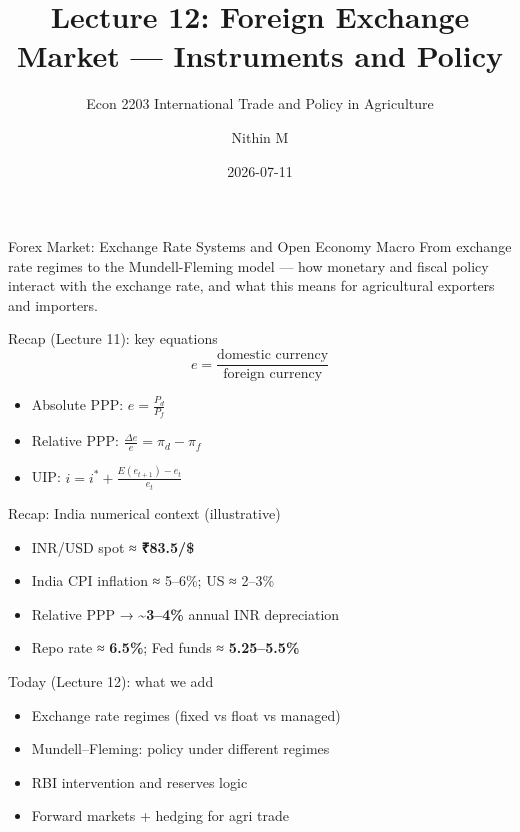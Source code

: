 \documentclass[
  ignorenonframetext,
  aspectratio=169,
]{beamer}
\title[L12 \textbar{} Forex Market]{Lecture 12: Foreign Exchange Market
--- Instruments and Policy}
\subtitle{Econ 2203 \textbar{} International Trade and Policy in
Agriculture}
\author{Nithin M}
\date{2026-07-11}
\institute{Department of Development Economics}
\makeatletter
\providecommand{\tightlist}{%
  \setlength{\itemsep}{0pt}\setlength{\parskip}{0pt}}
\let\quarto@originallabel\label
\DeclareRobustCommand*{\label}[1]{\quarto@originallabel{#1}}
\makeatother
\begin{document}
\frame{\titlepage}


\begin{frame}{Forex Market: Exchange Rate Systems and Open Economy
Macro}
\label{forex-market-exchange-rate-systems-and-open-economy-macro}
From exchange rate regimes to the Mundell-Fleming model --- how monetary
and fiscal policy interact with the exchange rate, and what this means
for agricultural exporters and importers.
\end{frame}

\begin{frame}{Recap (Lecture 11): key equations}
\label{recap-lecture-11-key-equations}
\[e = \frac{\text{domestic currency}}{\text{foreign currency}}\]

\begin{itemize}
\tightlist
\item
  Absolute PPP: \(e = \frac{P_d}{P_f}\)
\item
  Relative PPP: \(\frac{\Delta e}{e} = \pi_d - \pi_f\)
\item
  UIP: \(i = i^* + \frac{E(e_{t+1}) - e_t}{e_t}\)
\end{itemize}
\end{frame}

\begin{frame}{Recap: India numerical context (illustrative)}
\label{recap-india-numerical-context-illustrative}
\begin{itemize}
\tightlist
\item
  INR/USD spot ≈ \textbf{₹83.5/\$}
\item
  India CPI inflation ≈ 5--6\%; US ≈ 2--3\%
\item
  Relative PPP → \textbf{\textasciitilde3--4\%} annual INR depreciation
\item
  Repo rate ≈ \textbf{6.5\%}; Fed funds ≈ \textbf{5.25--5.5\%}
\end{itemize}
\end{frame}

\begin{frame}{Today (Lecture 12): what we add}
\label{today-lecture-12-what-we-add}
\begin{itemize}
\tightlist
\item
  Exchange rate regimes (fixed vs float vs managed)
\item
  Mundell--Fleming: policy under different regimes
\item
  RBI intervention and reserves logic
\item
  Forward markets + hedging for agri trade
\end{itemize}
\end{frame}
\end{document}
